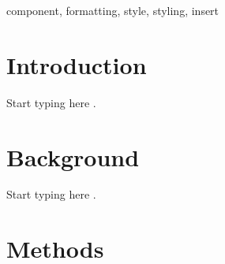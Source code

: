 \documentclass[conference]{IEEEtran}
\begin{document}

\begin{abstract}
This document is a model and instructions for \LaTeX.
This and the IEEEtran.cls file define the components of your paper [title, text, heads, etc.]. *CRITICAL: Do Not Use Symbols, Special Characters, Footnotes, 
or Math in Paper Title or Abstract.
This document is a model and instructions for \LaTeX.
This and the IEEEtran.cls file define the components of your paper [title, text, heads, etc.]. *CRITICAL: Do Not Use Symbols, Special Characters, Footnotes, 
or Math in Paper Title or Abstract.
This document is a model and instructions for \LaTeX.
This and the IEEEtran.cls file define the components of your paper [title, text, heads, etc.]. *CRITICAL: Do Not Use Symbols, Special Characters, Footnotes, 
or Math in Paper Title or Abstract.
This document is a model and instructions for \LaTeX.
This and the IEEEtran.cls file define the components of your paper [title, text, heads, etc.]. *CRITICAL: Do Not Use Symbols, Special Characters, Footnotes, 
or Math in Paper Title or Abstract.

\end{abstract}



\begin{IEEEkeywords}
component, formatting, style, styling, insert
\end{IEEEkeywords}

\section{Introduction}

Start typing here \cite{b1}.

\section{Background}

Start typing here \cite{b2}.

\section{Methods}
\end{document}
